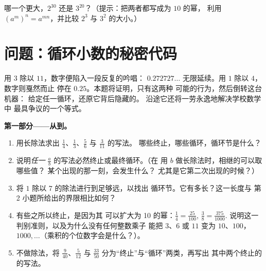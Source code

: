 \begin{exercise}[$\star\star\star$]\label{exo:g9:fractions:10}
哪一个更大，$2^{30}$ 还是 $3^{20}$？（提示：把两者都写成为 $10$ 的幂，
利用 $\left(a^m\right)^n = a^{mn}$，并比较 $2^3$ 与
$3^2$ 的大小。）
\end{exercise}

\section{问题：循环小数的秘密代码}

\begin{problem}
\label{pb:g9:fractions:1}
用 $3$ 除以 $11$，数字便陷入一段反复的吟唱：
$0.272727\ldots$ 无限延续。用 $1$ 除以 $4$，数字则戛然而止
停在 $0.25$。本题将证明，只有这两种
可能的行为，然后倒转这台机器：
给定任一循环，还原它背后隐藏的。
沿途它还将一劳永逸地解决学校数学中
最具争议的一个等式。

\medskip
\noindent\textbf{第一部分——从到。}
\begin{enumerate}
  \item 用长除法求出
        $\frac14$、$\frac13$、$\frac56$ 与 $\frac{3}{11}$ 的写法。
        哪些终止，哪些循环，循环节是什么？
  \item 说明\emph{任一}
        $\frac ab$ 的写法必然终止或最终循环。（在
        用 $b$ 做长除法时，相继的可以取哪些值？
        某个出现的那一刻，会发生什么？
        尤其是它第二次出现的时候？）
  \item 将 $1$ 除以 $7$ 的除法进行到足够远，以找出
        循环节。它有多长？这一长度与
        第 2 小题所给出的界限相比如何？
  \item 有些之所以终止，是因为其
        可以扩大为 10 的幂：$\frac14 =
        \frac{25}{100}$, $\frac{3}{8} = \frac{375}{1000}$.
        说明这一判别准则，以及为什么没有任何整数乘子
        能把 $3$、$6$ 或 $11$ 变为 $10$、$100$，
        $1000, \dots$（乘积的个位数字会是什么？）。
  \item 不做除法，将 $\frac{9}{40}$、$\frac{5}{12}$ 与
        $\frac{33}{50}$ 分为“终止”与“循环”两类，再写出
        其中两个终止的的写法。
\end{enumerate}


\end{problem}
